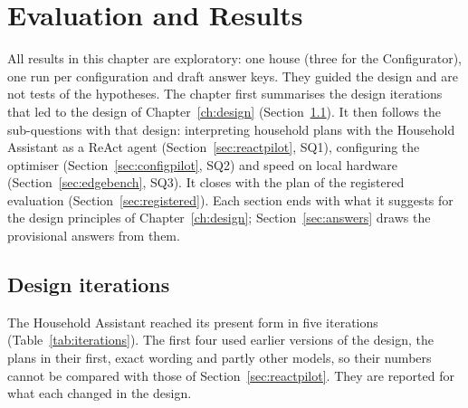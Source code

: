 \documentclass[12pt,a4paper]{report}
\begin{document}
\chapter{Evaluation and Results}
\label{ch:results}

All results in this chapter are exploratory: one house (three for the
Configurator), one run per configuration and draft answer keys. They guided the design and are not
tests of the hypotheses. The chapter first summarises the design
iterations that led to the design of Chapter~\ref{ch:design}
(Section~\ref{sec:iterations}). It then follows the sub-questions with
that design: interpreting household plans with the Household Assistant
as a ReAct agent (Section~\ref{sec:reactpilot}, SQ1), configuring the
optimiser (Section~\ref{sec:configpilot}, SQ2) and speed on local
hardware (Section~\ref{sec:edgebench}, SQ3). It closes with the plan of
the registered evaluation (Section~\ref{sec:registered}). Each section
ends with what it suggests for the design principles of
Chapter~\ref{ch:design}; Section~\ref{sec:answers} draws the
provisional answers from them.

\section{Design iterations}
\label{sec:iterations}

The Household Assistant reached its present form in five iterations
(Table~\ref{tab:iterations}). The first four used earlier versions of
the design, the plans in their first, exact wording and partly other
models, so their numbers cannot be compared with those of
Section~\ref{sec:reactpilot}. They are reported for what each changed
in the design.
\end{document}
